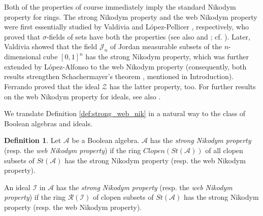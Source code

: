 \documentclass[a4paper,11pt,fleqn]{amsart}
\theoremstyle{definition}
\newtheorem{definition}[theorem]{Definition}
\theoremstyle{remark}
\numberwithin{equation}{section}
\newcommand{\aA}{\mathcal{A}}
\newcommand{\iI}{\mathcal{I}}
\newcommand{\rR}{\mathcal{R}}
\newcommand{\zZ}{\mathcal{Z}}
\begin{document}
Both of the properties of course immediately imply the standard Nikodym property for rings. The strong Nikodym property and the web Nikodym property were first essentially studied by Valdivia \cite{Val79} and L\'opez-Pellicer \cite{LP97}, respectively, who proved that $\sigma$-fields of sets have both the properties (see also \cite{KLP17} and \cite{LAMM}; cf. \cite[Chapter 21]{KKLPS}). Later, Valdivia \cite{Val13} showed that the field $\mathscr{J}_n$ of Jordan measurable subsets of the $n$-dimensional cube $[0,1]^n$ has the strong Nikodym property, which was further extended by L\'opez-Alfonso \cite{LA16} to the web Nikodym property (consequently, both results strengthen Schachermayer's theorem \cite{Sch82}, mentioned in Introduction). Ferrando \cite{Fer02} proved that the ideal $\zZ$ has the latter property, too. For further results on the web Nikodym property for ideals, see also \cite{FLALP}.

We translate Definition \ref{def:strong_web_nik} in a natural way to the class of Boolean algebras and ideals.

\begin{definition}\label{def:strong_web_nik_alg}
    Let $\aA$ be a Boolean algebra. $\aA$ has the \textit{strong Nikodym property} (resp. the \textit{web Nikodym property}) if the ring $Clopen(St(\aA))$ of all clopen subsets of $St(\aA)$ has the strong Nikodym property (resp. the web Nikodym property). 
    
    An ideal $\iI$ in $\aA$ has the \textit{strong Nikodym property} (resp. the \textit{web Nikodym property}) if the ring $\rR(\iI)$ of clopen subsets of $St(\aA)$ has the strong Nikodym property (resp. the web Nikodym property). 
\end{definition}
\end{document}
